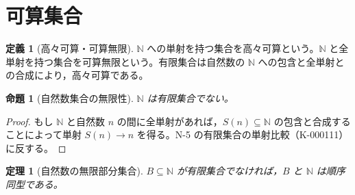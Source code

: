 \documentclass[a5paper,10pt,dvipdfmx]{jsarticle}
\theoremstyle{definition}
\newtheorem{defn}[ruledef]{定義}
\theoremstyle{plain}
\newtheorem{prop}[ruledef]{命題}
\newtheorem{thm}[ruledef]{定理}
\begin{document}
\section{可算集合}
\begin{defn}[高々可算・可算無限]\label{k138}
$\mathbb N$ への単射を持つ集合を高々可算という。$\mathbb N$ と全単射を持つ集合を可算無限という。有限集合は自然数の $\mathbb N$ への包含と全単射との合成により，高々可算である。
\end{defn}
\begin{prop}[自然数集合の無限性]\label{k139}
$\mathbb N$ は有限集合でない。
\end{prop}
\begin{proof}
もし $\mathbb N$ と自然数 $n$ の間に全単射があれば，$S(n)\subseteq\mathbb N$ の包含と合成することによって単射 $S(n)\to n$ を得る。N-5 の有限集合の単射比較（K-000111）に反する。
\end{proof}
\begin{thm}[自然数の無限部分集合]\label{k140}
$B\subseteq\mathbb N$ が有限集合でなければ，$B$ と $\mathbb N$ は順序同型である。
\end{thm}
\end{document}
